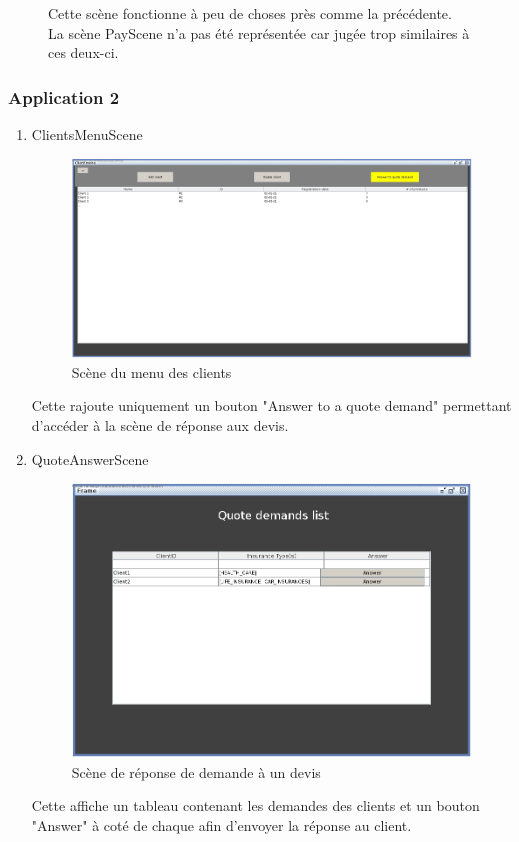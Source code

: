 \documentclass[../rapport.tex]{subfiles}
\begin{document}
\begin{enumerate}
\begin{figure}[h!]
								Cette scène fonctionne à peu de choses près comme la précédente. La scène PayScene n'a pas été représentée car jugée 
								trop similaires à ces deux-ci.
						\end{figure}
		\end{enumerate}
		\newpage

		\subsubsection{Application 2}
		\begin{enumerate}
		\item{ClientsMenuScene} 
						\begin{figure}[h!]
								\centering\includegraphics[scale=0.2]{ressources/photos_diagrammes/extensionThomas/gui2/clientsMenuScene.jpg}
								\caption{Scène du menu des clients}
						\end{figure}

						Cette rajoute uniquement un bouton "Answer to a quote demand" permettant d'accéder à la scène de réponse aux devis.
		\newpage
		\item{QuoteAnswerScene}
						\begin{figure}[h!]
								\centering\includegraphics[scale=0.4]{ressources/photos_diagrammes/extensionThomas/gui2/quoteAnswerScene.jpg}
								\caption{Scène de réponse de demande à un devis}
						\end{figure}

						Cette affiche un tableau contenant les demandes des clients et un bouton "Answer" à coté de chaque afin d'envoyer la réponse au client.
		\end{enumerate}
\newpage
\end{document}
